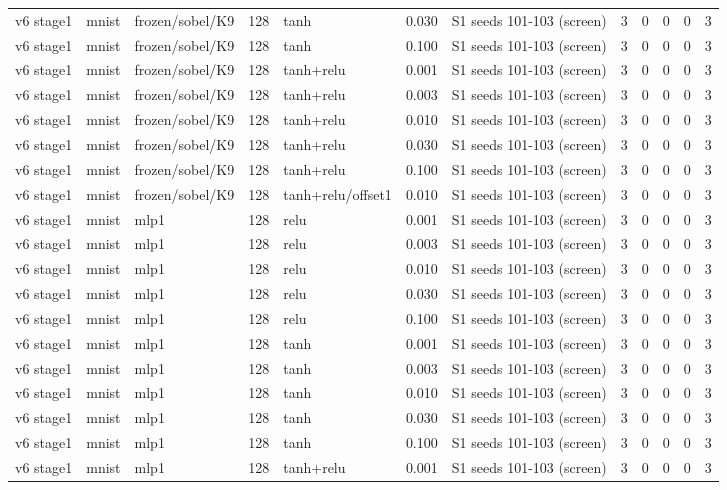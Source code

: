 \begin{table}[htbp]
{\begin{tabular}{@{}lllrlrlrrrrr@{}}
v6 stage1 & mnist & frozen/sobel/K9 & 128 & tanh & 0.030 & S1 seeds 101-103 (screen) & 3 & 0 & 0 & 0 & 3 \\
v6 stage1 & mnist & frozen/sobel/K9 & 128 & tanh & 0.100 & S1 seeds 101-103 (screen) & 3 & 0 & 0 & 0 & 3 \\
v6 stage1 & mnist & frozen/sobel/K9 & 128 & tanh+relu & 0.001 & S1 seeds 101-103 (screen) & 3 & 0 & 0 & 0 & 3 \\
v6 stage1 & mnist & frozen/sobel/K9 & 128 & tanh+relu & 0.003 & S1 seeds 101-103 (screen) & 3 & 0 & 0 & 0 & 3 \\
v6 stage1 & mnist & frozen/sobel/K9 & 128 & tanh+relu & 0.010 & S1 seeds 101-103 (screen) & 3 & 0 & 0 & 0 & 3 \\
v6 stage1 & mnist & frozen/sobel/K9 & 128 & tanh+relu & 0.030 & S1 seeds 101-103 (screen) & 3 & 0 & 0 & 0 & 3 \\
v6 stage1 & mnist & frozen/sobel/K9 & 128 & tanh+relu & 0.100 & S1 seeds 101-103 (screen) & 3 & 0 & 0 & 0 & 3 \\
v6 stage1 & mnist & frozen/sobel/K9 & 128 & tanh+relu/offset1 & 0.010 & S1 seeds 101-103 (screen) & 3 & 0 & 0 & 0 & 3 \\
v6 stage1 & mnist & mlp1 & 128 & relu & 0.001 & S1 seeds 101-103 (screen) & 3 & 0 & 0 & 0 & 3 \\
v6 stage1 & mnist & mlp1 & 128 & relu & 0.003 & S1 seeds 101-103 (screen) & 3 & 0 & 0 & 0 & 3 \\
v6 stage1 & mnist & mlp1 & 128 & relu & 0.010 & S1 seeds 101-103 (screen) & 3 & 0 & 0 & 0 & 3 \\
v6 stage1 & mnist & mlp1 & 128 & relu & 0.030 & S1 seeds 101-103 (screen) & 3 & 0 & 0 & 0 & 3 \\
v6 stage1 & mnist & mlp1 & 128 & relu & 0.100 & S1 seeds 101-103 (screen) & 3 & 0 & 0 & 0 & 3 \\
v6 stage1 & mnist & mlp1 & 128 & tanh & 0.001 & S1 seeds 101-103 (screen) & 3 & 0 & 0 & 0 & 3 \\
v6 stage1 & mnist & mlp1 & 128 & tanh & 0.003 & S1 seeds 101-103 (screen) & 3 & 0 & 0 & 0 & 3 \\
v6 stage1 & mnist & mlp1 & 128 & tanh & 0.010 & S1 seeds 101-103 (screen) & 3 & 0 & 0 & 0 & 3 \\
v6 stage1 & mnist & mlp1 & 128 & tanh & 0.030 & S1 seeds 101-103 (screen) & 3 & 0 & 0 & 0 & 3 \\
v6 stage1 & mnist & mlp1 & 128 & tanh & 0.100 & S1 seeds 101-103 (screen) & 3 & 0 & 0 & 0 & 3 \\
v6 stage1 & mnist & mlp1 & 128 & tanh+relu & 0.001 & S1 seeds 101-103 (screen) & 3 & 0 & 0 & 0 & 3 \\

\end{tabular}}
\end{table}

